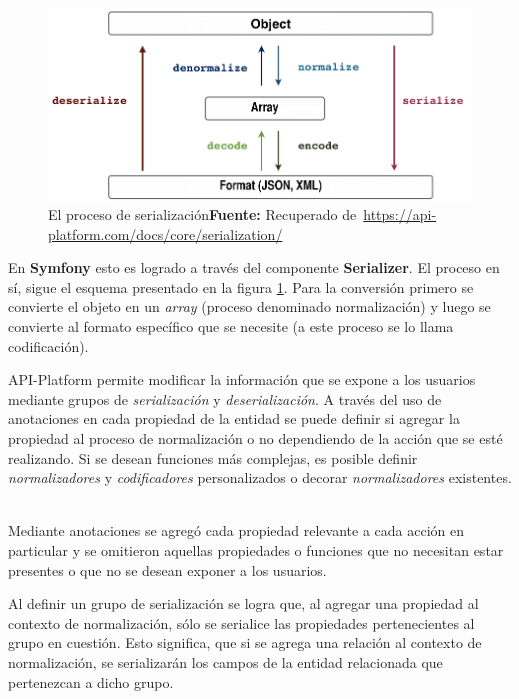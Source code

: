 \begin{figure}[H]
    \includegraphics[width=1\linewidth]{image/serializationWorkflow.png}
    \caption{El proceso de serialización\newline \textbf{Fuente:} Recuperado de~\url{https://api-platform.com/docs/core/serialization/}}
    \label{fig:image/serializationWorkflow}
\end{figure}

En \textbf{Symfony} esto es logrado a través del componente \textbf{Serializer}. El proceso en sí, sigue el esquema presentado en la figura
\ref{fig:image/serializationWorkflow}\@.
Para la conversión primero se convierte el objeto en un \textit{array} (proceso denominado
normalización) y luego se convierte al formato específico que se necesite (a este proceso se lo llama codificación).

API-Platform permite modificar la información que se expone a los usuarios mediante grupos de \textit{serialización} y \textit{deserialización}\@. A través del uso de anotaciones
en cada propiedad de la entidad se puede definir si agregar la propiedad al proceso de normalización o no dependiendo de la acción que se esté realizando.
Si se desean funciones más complejas, es posible definir \textit{normalizadores} y \textit{codificadores} personalizados o decorar \textit{normalizadores} existentes.
~\parencite{api-platform-serialization}


Mediante anotaciones se agregó cada propiedad relevante a cada acción en particular y se omitieron aquellas propiedades o funciones que no necesitan estar
presentes o que no se desean exponer a los usuarios.

Al definir un grupo de serialización se logra que, al agregar una propiedad al contexto de normalización, sólo se serialice las propiedades pertenecientes
al grupo en cuestión. Esto significa, que si se agrega una relación al contexto de normalización, se serializarán los campos de la entidad relacionada
que pertenezcan a dicho grupo.

